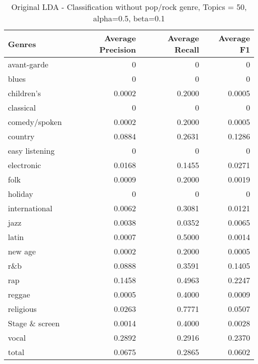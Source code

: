 \begin{table}[h]
\begin{tabular}{|l|r|r|r|}

\hline
\textbf{Genres} &  \textbf{Average Precision} & \textbf{Average Recall} & \textbf{Average F1} \\
\hline
avant-garde & 0	& 0& 	0\\
blues & 0	& 0	& 0\\
children's& 0.0002	& 0.2000	& 0.0005\\
classical& 0	& 0	& 0\\
comedy/spoken& 0.0002	& 0.2000	& 0.0005\\
country& 0.0884& 	0.2631	& 0.1286\\
easy listening& 0	& 0	& 0\\
electronic& 0.0168	& 0.1455	& 0.0271\\
folk& 0.0009	& 0.2000	& 0.0019\\
holiday& 0& 	0& 	0\\
international& 0.0062	& 0.3081& 	0.0121\\
jazz& 0.0038	& 0.0352& 	0.0065\\
latin& 0.0007	& 0.5000& 	0.0014\\
new age& 0.0002& 	0.2000	& 0.0005\\
r\&b& 0.0888	& 0.3591	& 0.1405\\
rap& 0.1458	& 0.4963	& 0.2247\\
reggae& 0.0005& 	0.4000	& 0.0009\\
religious& 0.0263	& 0.7771	& 0.0507\\
Stage \& screen& 0.0014& 	0.4000	& 0.0028\\
vocal& 0.2892	& 0.2916	& 0.2370\\
total& 0.0675	& 0.2865	& 0.0602\\
\hline
\end{tabular}
\caption{Original LDA - Classification without pop/rock genre, Topics = 50, alpha=0.5, beta=0.1}
\end{table}